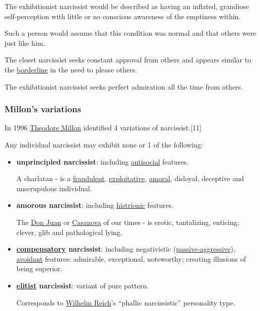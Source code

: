 \documentclass[oneside]{book}
\numberwithin{equation}{section}
\begin{document}
The exhibitionist narcissist would be described as having an inflated, grandiose self-perception with little or no conscious awareness of the emptiness within.

Such a person would assume that this condition was normal and that others were just like him.

The closet narcissist seeks constant approval from others and appears similar to the \href{https://en.wikipedia.org/wiki/Borderline_Personality_Disorder}{borderline} in the need to please others.

The exhibitionist narcissist seeks perfect admiration all the time from others.

\subsubsection{Millon's variations}
In 1996 \href{https://en.wikipedia.org/wiki/Theodore_Millon}{Theodore Millon} identified 4 variations of narcissist.[11]

Any individual narcissist may exhibit none or 1 of the following:
\begin{itemize}
    \item \textbf{unprincipled narcissist}: including \href{https://en.wikipedia.org/wiki/Antisocial_personality_disorder}{antisocial} features.
    
    A charlatan - is a \href{https://en.wikipedia.org/wiki/Charlatan}{fraudulent}, \href{https://en.wiktionary.org/wiki/exploit}{exploitative}, \href{https://en.wikipedia.org/wiki/Amorality}{amoral}, disloyal, deceptive and unscrupulous individual.
    \item \textbf{amorous narcissist}: including \href{https://en.wikipedia.org/wiki/Histrionic_personality_disorder}{histrionic} features.
    
    The \href{https://en.wikipedia.org/wiki/Don_Juan}{Don Juan} or \href{https://en.wikipedia.org/wiki/Giacomo_Casanova}{Casanova} of our times - is erotic, tantalizing, enticing; clever, glib and pathological lying.
    \item \textbf{\href{https://en.wikipedia.org/wiki/Compensation_(psychology)}{compensatory} narcissist}: including negativistic (\href{https://en.wikipedia.org/wiki/Passive-aggressive_personality_disorder}{passive-aggressive}), \href{https://en.wikipedia.org/wiki/Avoidant_personality_disorder}{avoidant} features: admirable, exceptional, noteworthy; creating illusions of being superior.
    \item \textbf{\href{https://en.wikipedia.org/wiki/Elitism}{elitist} narcissist}: variant of pure pattern.
    
    Corresponds to \href{https://en.wikipedia.org/wiki/Wilhelm_Reich}{Wilhelm Reich}'s ``phallic narcissistic'' personality type.
\end{itemize}
\end{document}

